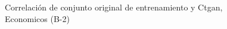 \begin{figure}[H]
    \centering
    
    \caption{Correlación de conjunto original de entrenamiento y Ctgan, Economicos (B-2)}
    \label{pairwise-economicos-b-2-ctgan}
\end{figure}